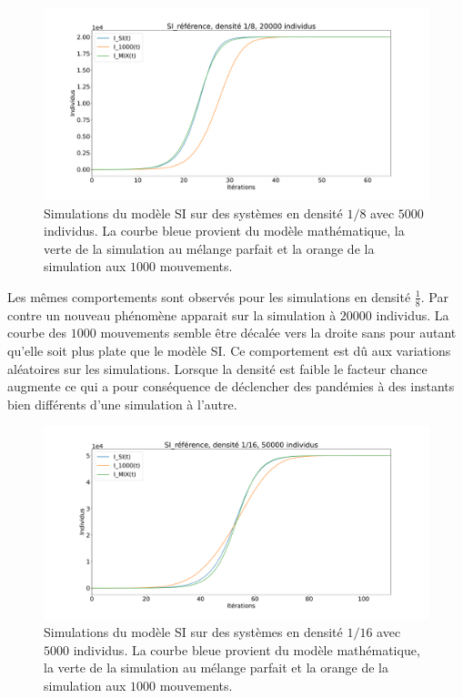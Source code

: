 \begin{figure}[h]
	\centering
	\captionsetup{justification=centering}
	\includegraphics[width=1\textwidth]{Images/SI_ref_8_20k.pdf}
	\caption[Simulations de SI, densité 1/8]{Simulations du modèle SI sur des systèmes en densité $1/8$ avec $5000$ individus. La courbe bleue provient du modèle mathématique, la verte de la simulation au mélange parfait et la orange de la simulation aux $1000$ mouvements.}
\end{figure}

Les mêmes comportements sont observés pour les simulations en densité $\frac{1}{8}$. Par contre un nouveau phénomène apparait sur la simulation à $20000$ individus. La courbe des $1000$ mouvements semble être décalée vers la droite sans pour autant qu'elle soit plus plate que le modèle SI. Ce comportement est dû aux variations aléatoires sur les simulations. Lorsque la densité est faible le facteur chance augmente ce qui a pour conséquence de déclencher des pandémies à des instants bien différents d'une simulation à l'autre.

\begin{figure}[h]
	\centering
	\captionsetup{justification=centering}
	\includegraphics[width=1\textwidth]{Images/SI_ref_16_50k.pdf}
	\caption[Simulations de SI, densité 1/16]{Simulations du modèle SI sur des systèmes en densité $1/16$ avec $5000$ individus. La courbe bleue provient du modèle mathématique, la verte de la simulation au mélange parfait et la orange de la simulation aux $1000$ mouvements.}
\end{figure}


